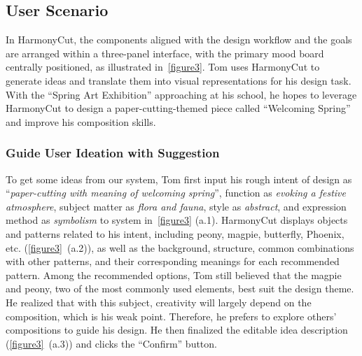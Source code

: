 
\subsection{User Scenario}
In HarmonyCut, the components aligned with the design workflow and the goals are arranged within a three-panel interface, with the primary mood board centrally positioned, as illustrated in~\autoref{figure3}.  Tom uses HarmonyCut to generate ideas and translate them into visual representations for his design task. With the ``Spring Art Exhibition'' approaching at his school, he hopes to leverage HarmonyCut to design a paper-cutting-themed piece called ``Welcoming Spring'' and improve his composition skills.

\subsubsection{Guide User Ideation with Suggestion}
To get some ideas from our system, Tom first input his rough intent of design as ``\textit{paper-cutting with meaning of welcoming spring}'', function as \textit{evoking a festive atmosphere}, subject matter as \textit{flora and fauna}, style as \textit{abstract}, and expression method as \textit{symbolism} to system in~\autoref{figure3} (a.1). HarmonyCut displays objects and patterns related to his intent, including peony, magpie, butterfly, Phoenix, etc. (\autoref{figure3}~(a.2)), as well as the background, structure, common combinations with other patterns, and their corresponding meanings for each recommended pattern. Among the recommended options, Tom still believed that the magpie and peony, two of the most commonly used elements, best suit the design theme. He realized that with this subject, creativity will largely depend on the composition, which is his weak point. Therefore, he prefers to explore others' compositions to guide his design. He then finalized the editable idea description (\autoref{figure3}~(a.3)) and clicks the ``Confirm'' button.

